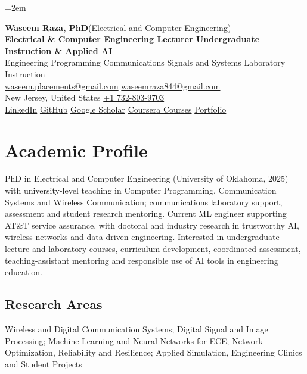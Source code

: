 \documentclass[8pt,letterpaper]{extarticle}
\begin{document}
\emergencystretch=2em
\begin{center}
{\LARGE\bfseries Waseem Raza, PhD}{\normalsize\mdseries \enspace (Electrical and Computer Engineering)}\\[2pt]
{\large\bfseries Electrical \& Computer Engineering Lecturer \textbar{} Undergraduate Instruction \& Applied AI}\\[1pt]
{\small Engineering Programming \textbar{} Communications \textbar{} Signals and Systems \textbar{} Laboratory Instruction}\\[3pt]
{\footnotesize {}\enspace \href{mailto:waseem.placements@gmail.com}{waseem.placements@gmail.com} \textbar{} \href{mailto:waseemraza844@gmail.com}{waseemraza844@gmail.com}\\[1pt]New Jersey, United States \quad {}\enspace \href{tel:+17328039703}{+1 732-803-9703}\\[1pt]\href{https://www.linkedin.com/in/waseem-raza-phd-9a737858/}{LinkedIn} \textbar{} \href{https://github.com/WaseemRaza844}{GitHub} \textbar{} \href{https://scholar.google.com/citations?user=d58Drr0AAAAJ\&hl=en}{Google Scholar} \textbar{} \href{https://waseemraza844.github.io/portfolio/learning.html}{Coursera Courses} \textbar{} \href{https://waseemraza844.github.io/portfolio/}{Portfolio}}
\end{center}
\vspace{-5pt}
\section{Academic Profile}
PhD in Electrical and Computer Engineering (University of Oklahoma, 2025) with university-level teaching in Computer Programming, Communication Systems and Wireless Communication; communications laboratory support, assessment and student research mentoring. Current ML engineer supporting AT\&T service assurance, with doctoral and industry research in trustworthy AI, wireless networks and data-driven engineering. Interested in undergraduate lecture and laboratory courses, curriculum development, coordinated assessment, teaching-assistant mentoring and responsible use of AI tools in engineering education.
\subsection{Research Areas}
Wireless and Digital Communication Systems; Digital Signal and Image Processing; Machine Learning and Neural Networks for ECE; Network Optimization, Reliability and Resilience; Applied Simulation, Engineering Clinics and Student Projects\par
{}
\end{document}

